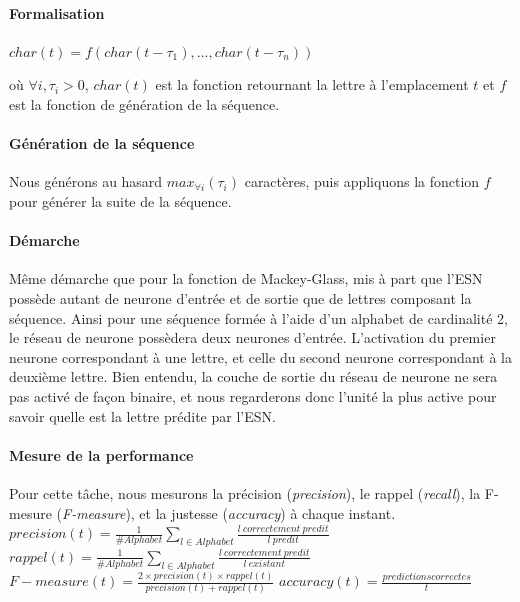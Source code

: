 \documentclass[12pt]{article}
\begin{document}
\paragraph{Formalisation}
\begin{center}
$char(t) = f( char(t-\tau_{1}),..., char(t-\tau_{n}) )$
\end{center}
où $\forall i, \tau_{i} > 0$, $char(t)$ est la fonction retournant la lettre à l'emplacement $t$ et $f$ est la fonction de génération de la séquence.
\paragraph{Génération de la séquence}
Nous générons au hasard $max_{\forall i}(\tau_{i})$ caractères, puis appliquons la fonction $f$ pour générer la suite de la séquence.
\paragraph{Démarche}
Même démarche que pour la fonction de Mackey-Glass, mis à part que l'ESN possède autant de neurone d'entrée et de sortie que de lettres composant la séquence. Ainsi pour une séquence formée à l'aide d'un alphabet de cardinalité 2, le réseau de neurone possèdera deux neurones d'entrée. L'activation du premier neurone correspondant à une lettre, et celle du second neurone correspondant à la deuxième lettre. Bien entendu, la couche de sortie du réseau de neurone ne sera pas activé de façon binaire, et nous regarderons donc l'unité la plus active pour savoir quelle est la lettre prédite par l'ESN.
\paragraph{Mesure de la performance}
Pour cette tâche, nous mesurons la précision (\textit{precision}), le rappel (\textit{recall}), la F-mesure (\textit{F-measure}), et la justesse (\textit{accuracy}) à chaque instant. 
\newline
\newline
$precision(t) = \frac{1}{\#Alphabet} \sum_{l \in Alphabet} \frac{l\ correctement\ predit}{l\ predit}$
\newline
\newline
$rappel(t) = \frac{1}{\#Alphabet} \sum_{l \in Alphabet} \frac{l\ correctement\ predit}{l\ existant}$
\newline
\newline
$F-measure(t) = \frac{2 \times precision(t) \times rappel(t)}{precision(t) + rappel(t)}$
\newline
\newline
$accuracy(t)= \frac{predictions correctes}{t}$
\end{document}
